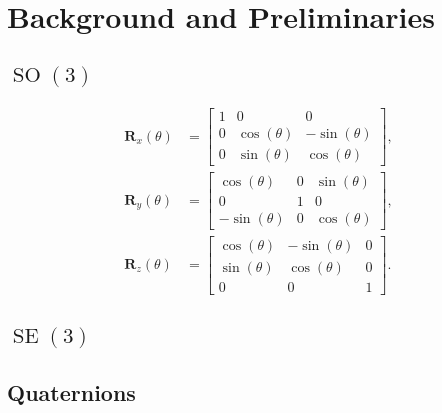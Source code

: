 \chapter{Background and {Preliminaries}}

\section{$\operatorname{SO}(3)$}

\begin{subequations}
\label{eq:bp:so3:rotations}
\begin{align}
    \bm{R}_x(\theta) &= \begin{bmatrix}
        1 & 0 & 0 \\
        0 & \cos(\theta) & -\sin(\theta) \\
        0 & \sin(\theta) & \cos(\theta)
    \end{bmatrix}, \\
    \bm{R}_y(\theta) &= \begin{bmatrix}
        \cos(\theta) & 0 & \sin(\theta) \\
        0 & 1 & 0 \\
        -\sin(\theta) & 0 & \cos(\theta)
    \end{bmatrix}, \\
    \bm{R}_z(\theta) &= \begin{bmatrix}
        \cos(\theta) & -\sin(\theta) & 0 \\
        \sin(\theta) & \cos(\theta) & 0 \\
        0 & 0 & 1
    \end{bmatrix}.
\end{align}
\end{subequations}

\section{$\operatorname{SE}(3)$}

\section{Quaternions}

